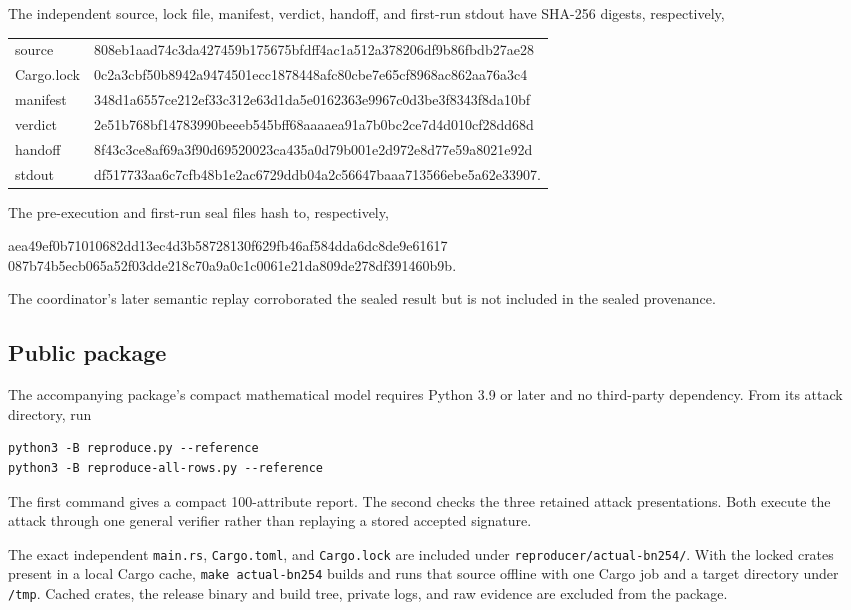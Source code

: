 \documentclass[10pt,a4paper]{article}
\begin{document}
The independent source, lock file, manifest, verdict, handoff, and first-run
stdout have SHA-256 digests, respectively,
\begin{center}
\small\ttfamily
\begin{tabular}{@{}ll@{}}
source & 808eb1aad74c3da427459b175675bfdff4ac1a512a378206df9b86fbdb27ae28\\
Cargo.lock & 0c2a3cbf50b8942a9474501ecc1878448afc80cbe7e65cf8968ac862aa76a3c4\\
manifest & 348d1a6557ce212ef33c312e63d1da5e0162363e9967c0d3be3f8343f8da10bf\\
verdict & 2e51b768bf14783990beeeb545bff68aaaaea91a7b0bc2ce7d4d010cf28dd68d\\
handoff & 8f43c3ce8af69a3f90d69520023ca435a0d79b001e2d972e8d77e59a8021e92d\\
stdout & df517733aa6c7cfb48b1e2ac6729ddb04a2c56647baaa713566ebe5a62e33907.
\end{tabular}
\end{center}
The pre-execution and first-run seal files hash to, respectively,
\begin{center}
\small\ttfamily
aea49ef0b71010682dd13ec4d3b58728130f629fb46af584dda6dc8de9e61617\\
087b74b5ecb065a52f03dde218c70a9a0c1c0061e21da809de278df391460b9b.
\end{center}
The coordinator's later semantic replay corroborated the sealed result but is
not included in the sealed provenance.

\subsection{Public package}

The accompanying package's compact mathematical model requires Python 3.9 or
later and no third-party dependency. From its attack directory, run
\begin{verbatim}
python3 -B reproduce.py --reference
python3 -B reproduce-all-rows.py --reference
\end{verbatim}
The first command gives a compact 100-attribute report. The second checks the
three retained attack presentations. Both execute the attack through one
general verifier rather than replaying a stored accepted signature.

The exact independent \texttt{main.rs}, \texttt{Cargo.toml}, and
\texttt{Cargo.lock} are included under
\nolinkurl{reproducer/actual-bn254/}. With the locked crates present in a local
Cargo cache, \texttt{make actual-bn254} builds and runs that source offline
with one Cargo job and a target directory under \texttt{/tmp}. Cached crates,
the release binary and build tree, private logs, and raw evidence are excluded
from the package.
\end{document}
